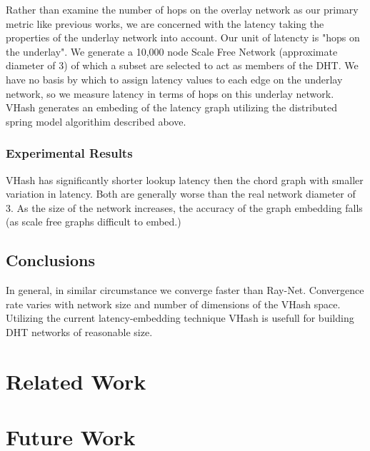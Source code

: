 \documentclass{IEEEtran}
\begin{document}
Rather than examine the number of hops on the overlay network as our primary metric like previous works, we are concerned with the latency taking the properties of the underlay network into account.
Our unit of latencty is "hops on the underlay".
We generate a 10,000 node Scale Free Network (approximate diameter of 3) of which a subset are selected to act as members of the DHT.
We have no basis by which to assign latency values to each edge on the underlay network, so we measure latency in terms of hops on this underlay network.
VHash generates an embeding of the latency graph utilizing the distributed spring model algorithim described above.

\subsubsection{Experimental Results}
VHash has significantly shorter lookup latency then the chord graph with smaller variation in latency.
Both are generally worse than the real network diameter of 3.
As the size of the network increases, the accuracy of the graph embedding falls (as scale free graphs difficult to embed.)

\subsection{Conclusions}
In general, in similar circumstance we converge faster than Ray-Net.
Convergence rate varies with network size and number of dimensions of the VHash space.
Utilizing the current latency-embedding technique VHash is usefull for building DHT networks of reasonable size.

\section{Related Work}

\section{Future Work}



\end{document}

